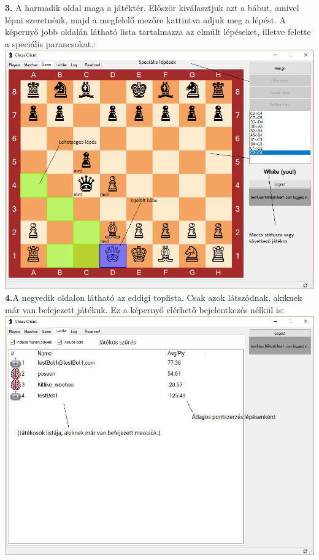 \documentclass[twoside, a4paper, 12pt]{book}
\begin{document}
\noindent \textbf{3.} A harmadik oldal maga a játéktér. Először kiválasztjuk azt a bábut, amivel lépni szeretnénk, majd a megfelelő mezőre kattintva adjuk meg a lépést. A képernyő jobb oldalán látható lista tartalmazza az elmúlt lépéseket, illetve felette a speciális parancsokat.: \\
\includegraphics[width=1.0\textwidth]{img/chessClient_3.png} \\

\noindent \textbf{4.}A negyedik oldalon látható az eddigi toplista. Csak azok látszódnak, akiknek már van befejezett játékuk. Ez a képernyő elérhető bejelentkezés nélkül is: \\
\includegraphics[width=1.0\textwidth]{img/chessClient_4.png} \\
\end{document}
